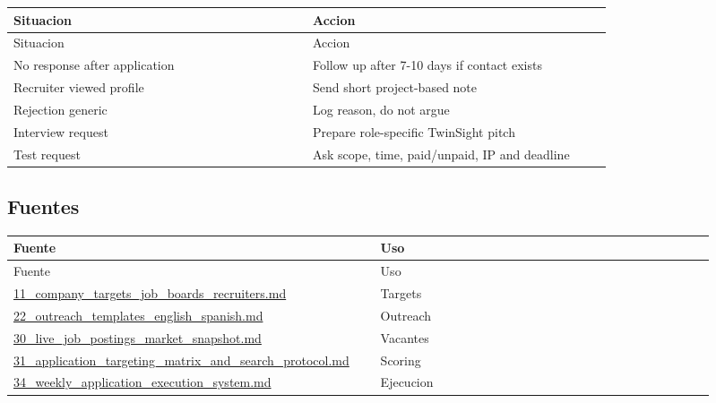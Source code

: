 \begin{center}
\scriptsize
\begin{longtable}{>{\raggedright\arraybackslash}p{0.455\linewidth} >{\raggedright\arraybackslash}p{0.455\linewidth}}
\toprule
Situacion & Accion \\
\midrule
\endfirsthead
\toprule
Situacion & Accion \\
\midrule
\endhead
No response after application & Follow up after 7-10 days if contact exists \\
Recruiter viewed profile & Send short project-based note \\
Rejection generic & Log reason, do not argue \\
Interview request & Prepare role-specific TwinSight pitch \\
Test request & Ask scope, time, paid/unpaid, IP and deadline \\
\bottomrule
\end{longtable}
\end{center}


\subsection{Fuentes}


\begin{center}
\scriptsize
\begin{longtable}{>{\raggedright\arraybackslash}p{0.455\linewidth} >{\raggedright\arraybackslash}p{0.455\linewidth}}
\toprule
Fuente & Uso \\
\midrule
\endfirsthead
\toprule
Fuente & Uso \\
\midrule
\endhead
\href{file:///E:/Laboral/11_company_targets_job_boards_recruiters.md}{11\_company\_targets\_job\_boards\_recruiters.md} & Targets \\
\href{file:///E:/Laboral/22_outreach_templates_english_spanish.md}{22\_outreach\_templates\_english\_spanish.md} & Outreach \\
\href{file:///E:/Laboral/30_live_job_postings_market_snapshot.md}{30\_live\_job\_postings\_market\_snapshot.md} & Vacantes \\
\href{file:///E:/Laboral/31_application_targeting_matrix_and_search_protocol.md}{31\_application\_targeting\_matrix\_and\_search\_protocol.md} & Scoring \\
\href{file:///E:/Laboral/34_weekly_application_execution_system.md}{34\_weekly\_application\_execution\_system.md} & Ejecucion \\
\bottomrule
\end{longtable}
\end{center}
